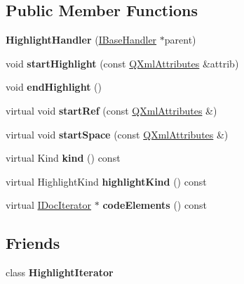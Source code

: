 \subsection*{Public Member Functions}
\begin{DoxyCompactItemize}
\item 
\mbox{\label{class_highlight_handler_ae00bea7c9612d3f242cb30b60b5c35c1}} 
{\bfseries Highlight\+Handler} (\mbox{\hyperlink{class_i_base_handler}{I\+Base\+Handler}} $\ast$parent)
\item 
\mbox{\label{class_highlight_handler_a66b287f9ec5fc6d251595e97cff0d6cf}} 
void {\bfseries start\+Highlight} (const \mbox{\hyperlink{class_q_xml_attributes}{Q\+Xml\+Attributes}} \&attrib)
\item 
\mbox{\label{class_highlight_handler_aaac89f347545f88c79857234065ec9d9}} 
void {\bfseries end\+Highlight} ()
\item 
\mbox{\label{class_highlight_handler_a5c42568fc0ad6b0666cb7c3e24182c5c}} 
virtual void {\bfseries start\+Ref} (const \mbox{\hyperlink{class_q_xml_attributes}{Q\+Xml\+Attributes}} \&)
\item 
\mbox{\label{class_highlight_handler_a4d4afb71d7af981477f582c3692cae56}} 
virtual void {\bfseries start\+Space} (const \mbox{\hyperlink{class_q_xml_attributes}{Q\+Xml\+Attributes}} \&)
\item 
\mbox{\label{class_highlight_handler_ab0729f8d742ad1478402ead6aada20ff}} 
virtual Kind {\bfseries kind} () const
\item 
\mbox{\label{class_highlight_handler_a21632f38588cb436973942e8ded35bbe}} 
virtual Highlight\+Kind {\bfseries highlight\+Kind} () const
\item 
\mbox{\label{class_highlight_handler_af08c7e2592d8e0caa0748255e78ddde7}} 
virtual \mbox{\hyperlink{class_i_doc_iterator}{I\+Doc\+Iterator}} $\ast$ {\bfseries code\+Elements} () const
\end{DoxyCompactItemize}
\subsection*{Friends}
\begin{DoxyCompactItemize}
\item 
\mbox{\label{class_highlight_handler_a7aed790946df29e2ccac4eaa47911412}} 
class {\bfseries Highlight\+Iterator}
\end{DoxyCompactItemize}
